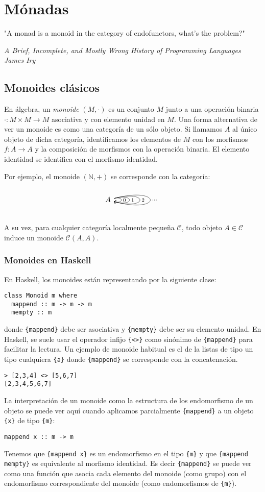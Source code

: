 \documentclass[12pt, twoside]{book}
\newcommand{\newterm}[1]{\index{#1}\emph{#1}}
\newcommand{\code}[1]{\Verb+{#1}+}
\newcommand{\cat}{{\mathcal{C}}}
\begin{document}
\chapter{Mónadas}
\epigraph{"A monad is a monoid in the category of endofunctors, what's the problem?"}{\textit{A Brief, Incomplete, and Mostly Wrong History of Programming Languages\\James Iry}}
\section{Monoides clásicos}
En álgebra, un \newterm{monoide} $(M,\cdot)$ es un conjunto $M$ junto a una operación binaria $\cdot \colon M \times M \to M$ asociativa y con elemento unidad en $M$.
Una forma alternativa de ver un monoide es como una categoría de un sólo objeto.
Si llamamos $A$ al único objeto de dicha categoría, identificamos los elementos de $M$ con los morfismos $f \colon A \to A$ y la composición de morfismos con la operación binaria.
El elemento identidad se identifica con el morfismo identidad.

Por ejemplo, el monoide $(\mathbb{N},+)$ se corresponde con la categoría:
\[
\begin{tikzcd}
A \arrow[loop right,"0" right] \arrow[loop right,distance=3em,"1" right] \arrow[loop right,distance=5em,"2" right]
\arrow[loop right,distance=7em,"\dots" right]
\end{tikzcd}
\]

A su vez, para cualquier categoría localmente pequeña $\cat$, todo objeto $A \in \cat$ induce un monoide $\cat(A,A)$.

\subsection{Monoides en Haskell}
En Haskell, los monoides están representando por la siguiente clase:
\begin{verbatim}
class Monoid m where
  mappend :: m -> m -> m
  mempty :: m
\end{verbatim}
donde \code{mappend} debe ser asociativa y \code{mempty} debe ser su elemento unidad.
En Haskell, se suele usar el operador infijo \code{<>} como sinónimo de \code{mappend} para facilitar la lectura.
Un ejemplo de monoide habitual es el de la listas de tipo un tipo cualquiera \code{a} donde \code{mappend} se corresponde con la concatenación.
\begin{verbatim}
> [2,3,4] <> [5,6,7]
[2,3,4,5,6,7]
\end{verbatim}
La interpretación de un monoide como la estructura de los endomorfismo de un objeto se puede ver aquí cuando aplicamos parcialmente \code{mappend} a un objeto \code{x} de tipo \code{m}:
\begin{verbatim}
mappend x :: m -> m
\end{verbatim}
Tenemos que \code{mappend x} es un endomorfismo en el tipo \code{m} y que \code{mappend mempty} es equivalente al morfismo identidad.
Es decir \code{mappend} se puede ver como una función que asocia cada elemento del monoide (como grupo) con el endomorfismo correspondiente del monoide (como endomorfismos de \code{m}).
\end{document}
